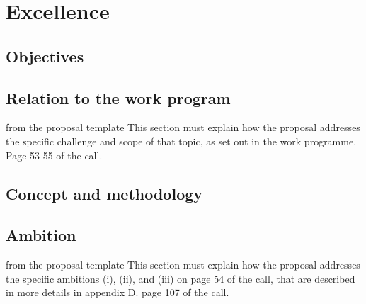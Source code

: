 \chapter{Excellence}


\section{Objectives}


\section{Relation to the work program}
\begin{todo}{from the proposal template}\color{red}
  This section must explain how the proposal addresses the specific challenge and scope of
  that topic, as set out in the work programme. Page 53-55 of the call.
\end{todo}


\section{Concept and methodology}


\section{Ambition}
\begin{todo}{from the proposal template}\color{red}
  This section must explain how the proposal addresses the specific ambitions (i), (ii),
  and (iii) on page 54 of the call, that are described in more details in appendix D. page
  107 of the call.
\end{todo}







